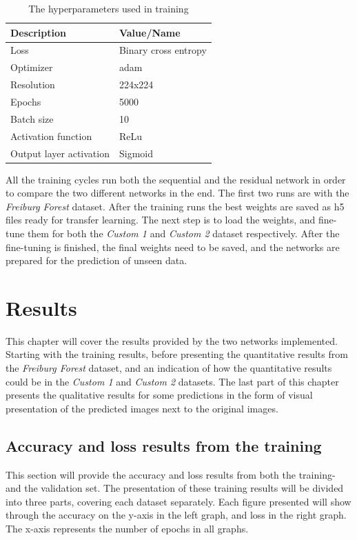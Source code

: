 \documentclass[USenglish]{ifimaster}  %
\begin{document}
\begin{table}[ht]
\centering
\begin{tabular}{ll}
\hline
\textbf{Description} & \textbf{Value/Name}  \\ \hline
Loss &  Binary cross entropy\\
Optimizer &  adam \\
Resolution & 224x224 \\
Epochs &  5000 \\ 
Batch size & 10\\
Activation function & ReLu\\
Output layer activation & Sigmoid \\ \hline
\end{tabular}
\caption{The hyperparameters used in training}
\label{table:hyperparameters}
\end{table}

All the training cycles run both the sequential and the residual network in order to compare the two different networks in the end. The first two runs are with the \textit{Freiburg Forest} dataset. After the training runs the best weights are saved as h5 files ready for transfer learning. The next step is to load the weights, and fine-tune them for both the \textit{Custom 1} and \textit{Custom 2} dataset respectively. After the fine-tuning is finished, the final weights need to be saved, and the networks are prepared for the prediction of unseen data. 

\chapter{Results} 
This chapter will cover the results provided by the two networks implemented. Starting with the training results, before presenting the quantitative results from the \textit{Freiburg Forest} dataset, and an indication of how the quantitative results could be in the \textit{Custom 1} and \textit{Custom 2} datasets. The last part of this chapter presents the qualitative results for some predictions in the form of visual presentation of the predicted images next to the original images.

\section{Accuracy and loss results from the training}
This section will provide the accuracy and loss results from both the training- and the validation set. The presentation of these training results will be divided into three parts, covering each dataset separately. Each figure presented will show through the accuracy on the y-axis in the left graph, and loss in the right graph. The x-axis represents the number of epochs \cite{website:epoch} in all graphs.  
\end{document}
